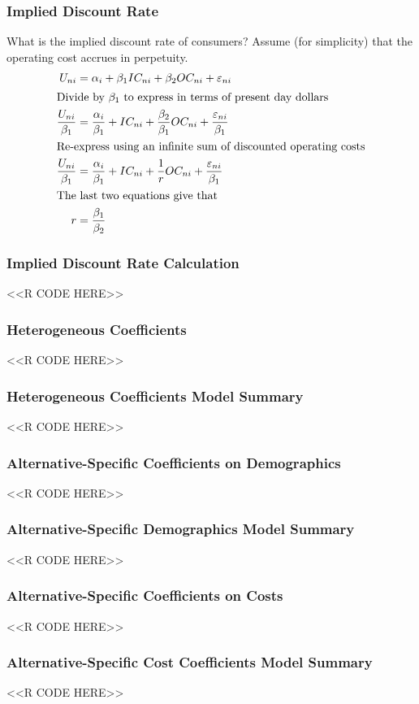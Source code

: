 \documentclass{beamer}
\begin{document}
\begin{frame}\frametitle{Implied Discount Rate}
    What is the implied discount rate of consumers? Assume (for simplicity) that the operating cost accrues in perpetuity.
    \begin{align*}
        U_{ni} &= \alpha_i + \beta_1 IC_{ni} + \beta_2 OC_{ni} + \varepsilon_{ni} \\
        \intertext{Divide by $\beta_1$ to express in terms of present day dollars}
        \frac{U_{ni}}{\beta_1} &= \frac{\alpha_i}{\beta_1} + IC_{ni} + \frac{\beta_2}{\beta_1} OC_{ni} + \frac{\varepsilon_{ni}}{\beta_1} \\
        \intertext{Re-express using an infinite sum of discounted operating costs}
        \frac{U_{ni}}{\beta_1} &= \frac{\alpha_i}{\beta_1} + IC_{ni} + \frac{1}{r} OC_{ni} + \frac{\varepsilon_{ni}}{\beta_1} \\
        \intertext{The last two equations give that}
        r &= \frac{\beta_1}{\beta_2}
    \end{align*}
\end{frame}

\begin{frame}[fragile]\frametitle{Implied Discount Rate Calculation}
    <<R CODE HERE>>
\end{frame}

\begin{frame}[fragile]\frametitle{Heterogeneous Coefficients}
    <<R CODE HERE>>
\end{frame}

\begin{frame}[fragile]\frametitle{Heterogeneous Coefficients Model Summary}
    <<R CODE HERE>>
\end{frame}

\begin{frame}[fragile]\frametitle{Alternative-Specific Coefficients on Demographics}
    <<R CODE HERE>>
\end{frame}

\begin{frame}[fragile]\frametitle{Alternative-Specific Demographics Model Summary}
    \vspace{1ex}
    <<R CODE HERE>>
\end{frame}

\begin{frame}[fragile]\frametitle{Alternative-Specific Coefficients on Costs}
    <<R CODE HERE>>
\end{frame}

\begin{frame}[fragile]\frametitle{Alternative-Specific Cost Coefficients Model Summary}
    \vspace{1ex}
    <<R CODE HERE>>
\end{frame}
\end{document}
